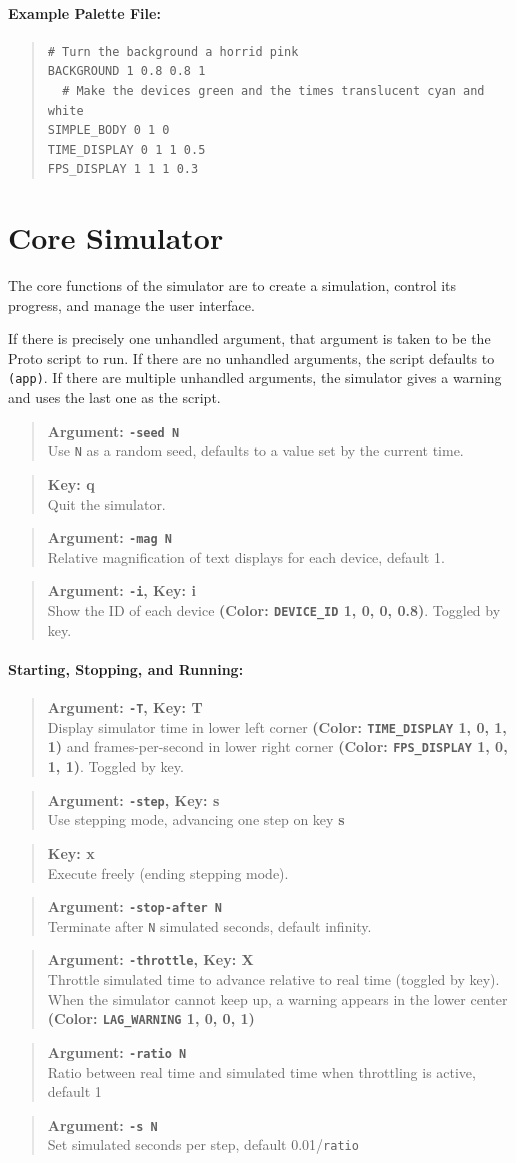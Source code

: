 \documentclass{article}
\newcommand\var[1]{{\tt #1}}
\newcommand\key[1]{{\bf #1}}
\newcommand\simarg[2]{\begin{quote} {\bf Argument: \var{#1}} \\ #2 \end{quote}}
\newcommand\simkey[2]{\begin{quote} {\bf Key: \key{#1}} \\ #2 \end{quote}}
\newcommand\simargkey[3]{
  \begin{quote} {\bf Argument: \var{#1}, Key: \key{#2}} \\ #3 \end{quote}
}
\newcommand\color[5]{{\bf (Color: {\tt #1} #2, #3, #4, #5)}} %
\begin{document}
\paragraph{Example Palette File:}
\begin{quote}
\begin{verbatim}
# Turn the background a horrid pink
BACKGROUND 1 0.8 0.8 1  
  # Make the devices green and the times translucent cyan and white
SIMPLE_BODY 0 1 0  
TIME_DISPLAY 0 1 1 0.5
FPS_DISPLAY 1 1 1 0.3
\end{verbatim}
\end{quote}


\section{Core Simulator}

The core functions of the simulator are to create a simulation,
control its progress, and manage the user interface.

If there is precisely one unhandled argument, that argument is taken
to be the Proto script to run.  If there are no unhandled
arguments, the script defaults to \var{(app)}.  If there are multiple
unhandled arguments, the simulator gives a warning and uses the last
one as the script.

\simarg{-seed N}{Use \var{N} as a random seed, defaults to a value set
  by the current time.}
\simkey{q}{Quit the simulator.}

\simarg{-mag N}{Relative magnification of text displays for each device,
  default 1.}
\simargkey{-i}{i}{Show the ID of each device \color{DEVICE\_ID}{1}{0}{0}{0.8}.
  Toggled by key.}

\paragraph{Starting, Stopping, and Running:}
\simargkey{-T}{T}{Display simulator time in lower left corner
  \color{TIME\_DISPLAY}{1}{0}{1}{1} and frames-per-second in lower
  right corner \color{FPS\_DISPLAY}{1}{0}{1}{1}. Toggled by key.}
\simargkey{-step}{s}{Use stepping mode, advancing one step on key \key{s}}
\simkey{x}{Execute freely (ending stepping mode).}
\simarg{-stop-after N}{Terminate after \var{N} simulated seconds,
  default infinity.}
\simargkey{-throttle}{X}{Throttle simulated time to advance relative
  to real time (toggled by key).  When the simulator cannot keep up, a
  warning appears in the lower center
  \color{LAG\_WARNING}{1}{0}{0}{1}}
\simarg{-ratio N}{Ratio between real time and simulated time when
  throttling is active, default 1}
\simarg{-s N}{Set simulated seconds per step, default 0.01/\var{ratio}}
\end{document}
